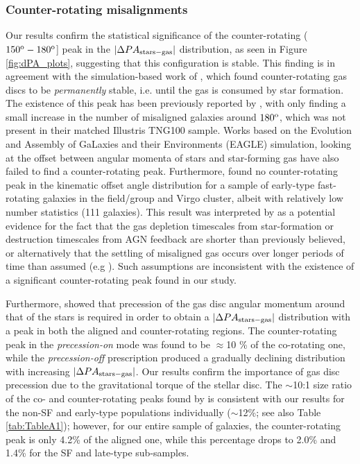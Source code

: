 \documentclass[fleqn,usenatbib]{mnras}
\begin{document}
\subsubsection{Counter-rotating misalignments}
Our results confirm the statistical significance of the counter-rotating ($150^{\rm{o}}-180^{\rm{o}}$] peak in the $|\Delta PA_{\rm{stars-gas}}|$ distribution, as seen in Figure \ref{fig:dPA_plots}, suggesting that this configuration is stable. This finding is in agreement with the simulation-based work of \cite{OsmanBekki2017}, which found counter-rotating gas discs to be \textit{permanently} stable, i.e. until the gas is consumed by star formation. The existence of this peak has been previously reported by \cite{Bryant2019}, with \cite{Duckworth} only finding a small increase in the number of misaligned galaxies around $180^{\rm{o}}$, which was not present in their matched Illustris TNG100 sample. Works based on the Evolution and Assembly of GaLaxies and their Environments (EAGLE) simulation, looking at the offset between angular momenta of stars and star-forming gas \citep{CdpLagos2015, Casanueva2022} have also failed to find a counter-rotating peak. Furthermore, \cite{Davis2011} found no counter-rotating peak in the kinematic offset angle distribution for a sample of early-type fast-rotating galaxies in the field/group and Virgo cluster, albeit with relatively low number statistics (111 galaxies). This result was interpreted by \cite{Davis2015} as a potential evidence for the fact that the gas depletion timescales from star-formation \citep{Bigiel2011,Kennicutt1998} or destruction timescales from AGN feedback \citep{Hopkins2006} are shorter than previously believed, or alternatively that the settling of misaligned gas occurs over longer periods of time than assumed (e.g \citealt{LakeNorman1983}). Such assumptions are inconsistent with the existence of a significant counter-rotating peak found in our study.

Furthermore, \cite*{Stevens2016} showed that precession of the gas disc angular momentum around that of the stars is required in order to obtain a $|\Delta PA_{\rm{stars-gas}}|$ distribution with a peak in both the aligned and counter-rotating regions. The counter-rotating peak in the \textit{precession-on} mode was found to be $\approx$10 \% of the co-rotating one, while the \textit{precession-off} prescription produced a gradually declining distribution with increasing $|\Delta PA_{\rm{stars-gas}}|$. Our results confirm the importance of gas disc precession due to the gravitational torque of the stellar disc. The $\sim$10:1 size ratio of the co- and counter-rotating peaks found by \cite{Stevens2016} is consistent with our results for the non-SF and early-type populations individually ($\sim$12\%; see also Table \ref{tab:TableA1}); however, for our entire sample of galaxies, the counter-rotating peak is only 4.2\% of the aligned one, while this percentage drops to 2.0\% and 1.4\% for the SF and late-type sub-samples. 
\end{document}
